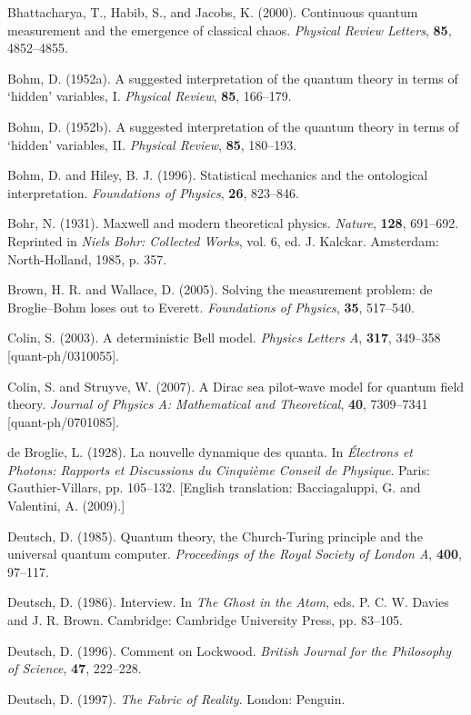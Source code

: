 \documentclass[12pt]{article}%
\begin{document}
Bhattacharya, T., Habib, S., and Jacobs, K. (2000). Continuous quantum
measurement and the emergence of classical chaos. \textit{Physical Review
Letters}, \textbf{85}, 4852--4855.

Bohm, D. (1952a). A suggested interpretation of the quantum theory in terms of
`hidden' variables, I. \textit{Physical Review}, \textbf{85}, 166--179.

Bohm, D. (1952b). A suggested interpretation of the quantum theory in terms of
`hidden' variables, II. \textit{Physical Review}, \textbf{85}, 180--193.

Bohm, D. and Hiley, B. J. (1996). Statistical mechanics and the ontological
interpretation. \textit{Foundations of Physics}, \textbf{26}, 823--846.

Bohr, N. (1931). Maxwell and modern theoretical physics. \textit{Nature},
\textbf{128}, 691--692. Reprinted in \textit{Niels Bohr: Collected Works},
vol. 6, ed. J. Kalckar. Amsterdam: North-Holland, 1985, p. 357.

Brown, H. R. and Wallace, D. (2005). Solving the measurement problem: de
Broglie--Bohm loses out to Everett. \textit{Foundations of Physics},
\textbf{35}, 517--540.

Colin, S. (2003). A deterministic Bell model. \textit{Physics Letters A},
\textbf{317}, 349--358 [quant-ph/0310055].

Colin, S. and Struyve, W. (2007). A Dirac sea pilot-wave model for quantum
field theory. \textit{Journal of Physics A: Mathematical and Theoretical},
\textbf{40}, 7309--7341 [quant-ph/0701085].

de Broglie, L. (1928). La nouvelle dynamique des quanta. In
\textit{\'{E}lectrons et Photons: Rapports et Discussions du Cinqui\`{e}me
Conseil de Physique}. Paris: Gauthier-Villars, pp. 105--132. [English
translation: Bacciagaluppi, G. and Valentini, A. (2009).]

Deutsch, D. (1985). Quantum theory, the Church-Turing principle and the
universal quantum computer. \textit{Proceedings of the Royal Society of London
A}, \textbf{400}, 97--117.

Deutsch, D. (1986). Interview. In \textit{The Ghost in the Atom}, eds. P. C.
W. Davies and J. R. Brown. Cambridge: Cambridge University Press, pp. 83--105.

Deutsch, D. (1996). Comment on Lockwood. \textit{British Journal for the
Philosophy of Science}, \textbf{47}, 222--228.

Deutsch, D. (1997). \textit{The Fabric of Reality}. London: Penguin.
\end{document}
